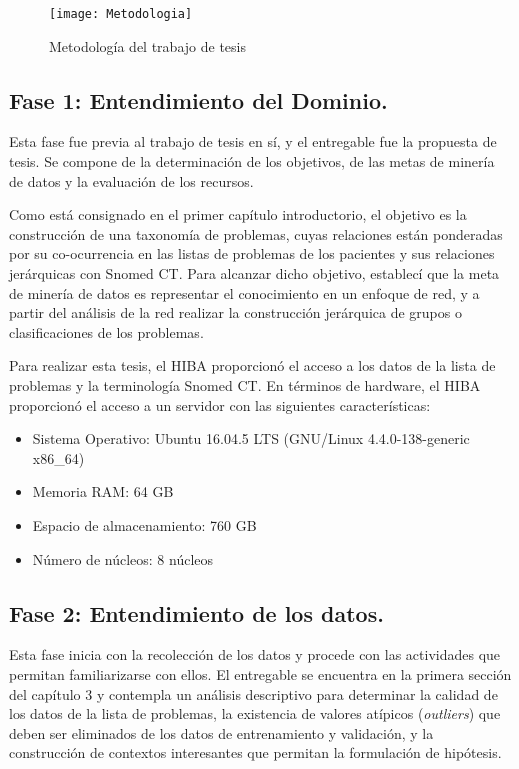 \begin{figure}[ht]
\caption{Metodología del trabajo de tesis}
\label{fig:Metodologia}
\centering
\texttt{[image: Metodologia]}
\end{figure}

\subsection{Fase 1: Entendimiento del Dominio.} Esta fase fue previa al trabajo de tesis en sí, y el entregable fue la propuesta de tesis. Se compone de la determinación de los objetivos, de las metas de minería de datos y la evaluación de los recursos.

Como está consignado en el primer capítulo introductorio, el objetivo es la construcción de una taxonomía de problemas, cuyas relaciones están ponderadas por su co-ocurrencia en las listas de problemas de los pacientes y sus relaciones jerárquicas con Snomed CT. Para alcanzar dicho objetivo, establecí que la meta de minería de datos es representar el conocimiento en un enfoque de red, y a partir del análisis de la red realizar la construcción jerárquica de grupos o clasificaciones de los problemas.

Para realizar esta tesis, el \acrshort{HIBA} proporcionó el acceso a los datos de la lista de problemas y la terminología Snomed CT. En términos de hardware, el \acrshort{HIBA} proporcionó el acceso a un servidor con las siguientes características:
\begin{itemize}
\item Sistema Operativo: Ubuntu 16.04.5 LTS (GNU/Linux 4.4.0-138-generic x86\_64)
\item Memoria RAM: 64 GB 
\item Espacio de almacenamiento: 760 GB
\item Número de núcleos: 8 núcleos
\end{itemize}

\subsection{Fase 2: Entendimiento de los datos.} Esta fase inicia con la recolección de los datos y procede con las actividades que permitan familiarizarse con ellos. El entregable se encuentra en la primera sección del capítulo 3 y contempla un análisis descriptivo para determinar la calidad de los datos de la lista de problemas, la existencia de valores atípicos (\textit{outliers})  que deben ser eliminados de los datos de entrenamiento y validación, y la construcción de contextos interesantes que permitan la formulación de hipótesis.

